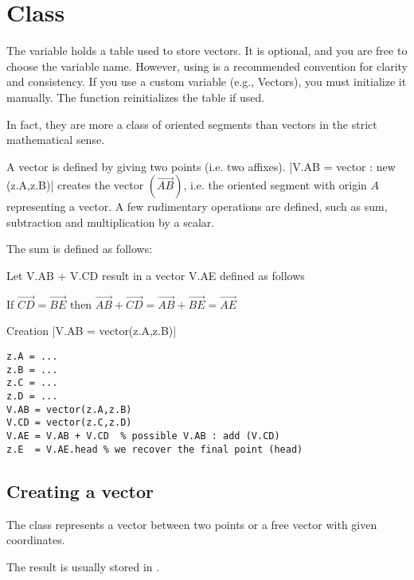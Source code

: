 \newpage

\section{Class } %
\label{sec:class_vector}
The variable  holds a table used to store vectors. It is optional, and you are free to choose the variable name. However, using  is a recommended convention for clarity and consistency. If you use a custom variable (e.g., Vectors), you must initialize it manually. The  function reinitializes the  table if used.

\vspace{1em}
In fact, they are more a class of oriented segments than vectors in the strict mathematical sense.

A vector is defined by giving two points (i.e. two affixes). 
|V.AB = vector : new (z.A,z.B)| creates the vector $(\overrightarrow{AB})$, i.e. the oriented segment with origin $A$ representing a vector. A few rudimentary operations are defined, such as sum, subtraction and multiplication by a scalar.

The sum is defined as follows:

Let V.AB + V.CD result in a vector V.AE defined as follows

If $\overrightarrow{CD} = \overrightarrow{BE} $ then $\overrightarrow{AB} + \overrightarrow{CD} = \overrightarrow{AB} + \overrightarrow{BE} =\overrightarrow{AE}$

\begin{mybox}
   Creation |V.AB = vector(z.A,z.B)|
\end{mybox}

\begin{verbatim}
z.A = ...
z.B = ...
z.C = ...
z.D = ...
V.AB = vector(z.A,z.B)
V.CD = vector(z.C,z.D)
V.AE = V.AB + V.CD  % possible V.AB : add (V.CD)
z.E  = V.AE.head % we recover the final point (head)
\end{verbatim}

\subsection{Creating a vector} %
\label{sub:creating_a_vector}

The  class represents a vector between two points or a free vector with given coordinates.

\medskip
The result is usually stored in .



